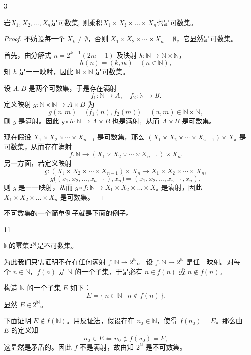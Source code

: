 \begin{mycor*}{3}

岩$X_1,X_2,\ldots,X_n$是可数集, 则乘积$X_1 \times X_2 \times \dots \times X_n$也是可数集。

\end{mycor*}

\begin{proof}
	不妨设每一个 \(X_k \neq \emptyset\)，否则 \(X_1 \times X_2 \times \cdots \times X_n = \emptyset\)，它显然是可数集。
	
	首先，由分解式 \(n = 2^{k-1}(2m-1)\) 及映射 \(h: \mathbb{N} \to \mathbb{N} \times \mathbb{N}\)，
	\[
	h(n) = (k, m) \quad (n \in \mathbb{N}),
	\]
	知 \(h\) 是一一映射，因此 \(\mathbb{N} \times \mathbb{N}\) 是可数集。
	
	设 \(A, B\) 是两个可数集，于是存在满射
	\[
	f_1: \mathbb{N} \to A, \quad f_2: \mathbb{N} \to B.
	\]
	定义映射 \(g: \mathbb{N} \times \mathbb{N} \to A \times B\) 为
	\[
	g(n, m) = \bigl(f_1(n), f_2(m)\bigr),\quad (n, m) \in \mathbb{N} \times \mathbb{N},
	\]
	则 \(g\) 是满射。因此 \(g \circ h: \mathbb{N} \to A \times B\) 也是满射，从而 \(A \times B\) 是可数集。
	
	现在假设 \(X_1 \times X_2 \times \cdots \times X_{n-1}\) 是可数集，那么 \((X_1 \times X_2 \times \cdots \times X_{n-1}) \times X_n\) 是可数集，从而存在满射
	\[
	f: \mathbb{N} \to (X_1 \times X_2 \times \cdots \times X_{n-1}) \times X_n.
	\]
	另一方面，若定义映射
	\[
	g: (X_1 \times X_2 \times \cdots \times X_{n-1}) \times X_n \longrightarrow X_1 \times X_2 \times \cdots \times X_n,
	\]
	\[
	g\bigl((x_1, x_2, \dots, x_{n-1}), x_n\bigr) = (x_1, x_2, \dots, x_{n-1}, x_n),
	\]
	则 \(g\) 是一一映射，从而 \(g \circ f: \mathbb{N} \to X_1 \times X_2 \times \dots \times X_n\) 是满射，因此 \(X_1 \times X_2 \times \dots \times X_n\) 是可数集。
\end{proof}

不可数集的一个简单例子就是下面的例子。

\begin{sourceexample}{11}

$\mathbb{N}$的幂集$2^{\mathbb{N}}$是不可数集。

为此我们只需证明不存在任何满射 \(f: \mathbb{N} \to 2^{\mathbb{N}}\)。
设 \(f: \mathbb{N} \to 2^{\mathbb{N}}\) 是任一映射。对每一个 \(n \in \mathbb{N}\)，\(f(n)\) 是 \(\mathbb{N}\) 的一个子集，于是必有 \(n \in f(n)\) 或 \(n \notin f(n)\)。

构造 \(\mathbb{N}\) 的一个子集 \(E\) 如下：
\[
E = \{\, n \in \mathbb{N} \mid n \notin f(n) \,\}.
\]
显然 \(E \in 2^{\mathbb{N}}\)。

下面证明 \(E \notin f(\mathbb{N})\)。用反证法，假设存在 \(n_0 \in \mathbb{N}\)，使得 \(f(n_0) = E\)。那么由 \(E\) 的定义知
\[
n_0 \in E \iff n_0 \notin f(n_0) = E,
\]
这显然是矛盾的。因此 \(f\) 不是满射，故由知 \(2^{\mathbb{N}}\) 是不可数集。


\end{sourceexample}



